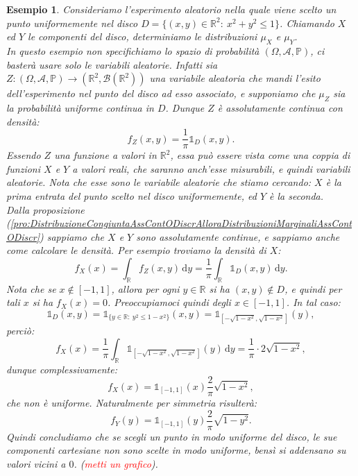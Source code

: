 \documentclass[11pt]{book}
\theoremstyle{Definizione}
\theoremstyle{TeoremaProposizioneLemmaCorollario}
\theoremstyle{OsservazioneNota}
\newtheorem{myes}{Esempio}[section]
\newcommand{\R}{\mathbb{R}}
\renewcommand{\P}{\mathbb{P}}
\renewcommand{\d}{\mathrm{d}}
\newcommand{\dy}{\,\d y}
\newcommand{\uno}[1]{\mathds{1}_{#1}}
\begin{document}
\begin{myes}
Consideriamo l'esperimento aleatorio nella quale viene scelto un punto uniformemente nel disco $D = \{(x,y)\in \R^2:\ x^2+y^2 \leq 1\}$. Chiamando $X$ ed $Y$ le componenti del disco, determiniamo le distribuzioni $\mu_X$ e $\mu_Y$.\\
In questo esempio non specifichiamo lo spazio di probabilità $(\Omega,\mathcal{A},\P)$, ci basterà usare solo le variabili aleatorie. Infatti sia $Z:(\Omega,\mathcal{A},\P)\longrightarrow (\R^2,\mathcal{B}(\R^2))$ una variabile aleatoria che mandi l'esito dell'esperimento nel punto del disco ad esso associato, e supponiamo che $\mu_Z$ sia la probabilità uniforme continua in $D$. Dunque $Z$ è assolutamente continua con densità:
$$
f_Z(x,y) = \frac{1}{\pi}\uno{D}(x,y).
$$
Essendo $Z$ una funzione a valori in $\R^2$, essa può essere vista come una coppia di funzioni $X$ e $Y$ a valori reali, che saranno anch'esse misurabili, e quindi variabili aleatorie. Nota che esse sono le variabile aleatorie che stiamo cercando: $X$ è la prima entrata del punto scelto nel disco uniformemente, ed $Y$ è la seconda.\\
Dalla proposizione (\ref{pro:DistribuzioneCongiuntaAssContODiscrAlloraDistribuzioniMarginaliAssContODiscr}) sappiamo che $X$ e $Y$ sono assolutamente continue, e sappiamo anche come calcolare le densità.
Per esempio troviamo la densità di $X$:
$$
f_X(x) = \int_\R f_Z(x,y)\dy = \frac{1}{\pi}\int_\R \uno{D}(x,y)\dy.
$$
Nota che se $x\notin [-1,1]$, allora per ogni $y\in \R$ si ha $(x,y)\notin D$, e quindi per tali $x$ si ha $f_X(x) = 0$. Preoccupiamoci quindi degli $x\in [-1,1]$. In tal caso:
$$
\uno{D}(x,y) = \uno{\{y\in \R:\ y^2\leq 1-x^2\}}(x,y) = \uno{[-\sqrt{1-x^2},\sqrt{1-x^2}]}(y),
$$
perciò:
$$
f_X(x) = \frac{1}{\pi}\int_\R \uno{[-\sqrt{1-x^2},\sqrt{1-x^2}]}(y)\dy = \frac{1}{\pi}\cdot 2 \sqrt{1-x^2},
$$
dunque complessivamente:
$$
f_X(x) = \uno{[-1,1]}(x) \frac{2}{\pi}\sqrt{1-x^2},
$$
che non è uniforme. Naturalmente per simmetria risulterà:
$$
f_Y(y) = \uno{[-1,1]}(y) \frac{2}{\pi}\sqrt{1-y^2}.
$$
Quindi concludiamo che se scegli un punto in modo uniforme del disco, le sue componenti cartesiane non sono scelte in modo uniforme, bensì si addensano su valori vicini a $0$. (\textcolor{red}{metti un grafico}). 
\end{myes}
\end{document}
